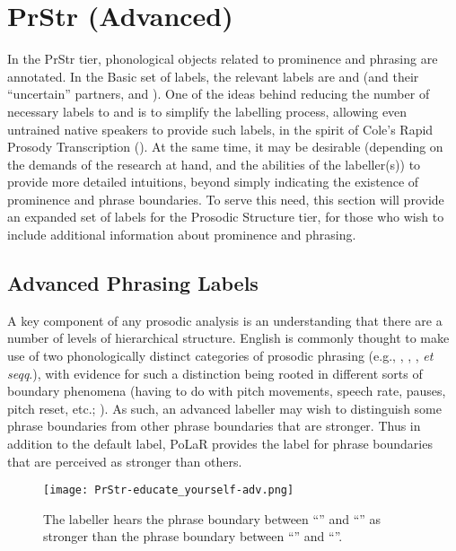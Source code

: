 \section{PrStr (Advanced)}\label{sec:prstr-advanced}

In the PrStr tier, phonological objects related to prominence and phrasing are annotated. In the Basic set of labels, the relevant labels are \textlabel{*} and \textlabel{]} (and their “uncertain” partners,  and \textlabel{?]}). One of the ideas behind reducing the number of necessary labels to \textlabel{*} and \textlabel{]} is to simplify the labelling process, allowing even untrained native speakers to provide such labels, in the spirit of Cole’s Rapid Prosody Transcription (\citealt{cole-14}). At the same time, it may be desirable (depending on the demands of the research at hand, and the abilities of the labeller(s)) to provide more detailed intuitions, beyond simply indicating the existence of prominence and phrase boundaries. To serve this need, this section will provide an expanded set of labels for the Prosodic Structure tier, for those who wish to include additional information about prominence and phrasing.

\subsection{Advanced Phrasing Labels}\label{sec:advanced-phrasing-labels}

A key component of any prosodic analysis is an understanding that there are a number of levels of hierarchical structure. English is commonly thought to make use of two phonologically distinct categories of prosodic phrasing (e.g., \citealt{selkirk81}, \citealt{beckmanpierrehumbert86}, \citealt{nesporvogel86}, \textit{et seqq}.), with evidence for such a distinction being rooted in different sorts of boundary phenomena (having to do with pitch movements, speech rate, pauses, pitch reset, etc.; \citealt{brugos-19}). As such, an advanced labeller may wish to distinguish some phrase boundaries from other phrase boundaries that are stronger. Thus in addition to the default \textlabel{]} label, PoLaR provides the \textlabel{]]} label for phrase boundaries that are perceived as stronger than others.

\begin{figure}[H]
\centering
%
\texttt{[image: PrStr-educate\_yourself-adv.png]}
%
\caption{The labeller hears the phrase boundary between “” and “” as stronger than the phrase boundary between “” and “”.%
\label{fig:educate yourself PrStr Adv}%
}
\end{figure}

